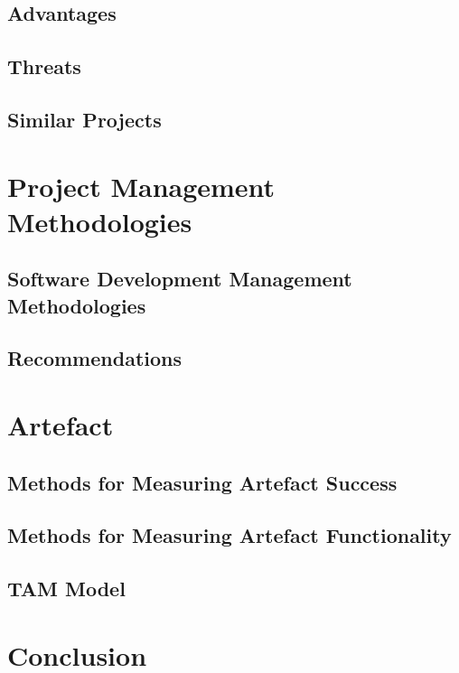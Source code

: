\subsection{Advantages}
\subsection{Threats}
\subsection{Similar Projects}

\section{Project Management Methodologies}
\subsection{Software Development Management Methodologies}
\subsection{Recommendations}

\section{Artefact}
\subsection{Methods for Measuring Artefact Success}
\subsection{Methods for Measuring Artefact Functionality}
\subsection{TAM Model}

\section{Conclusion}